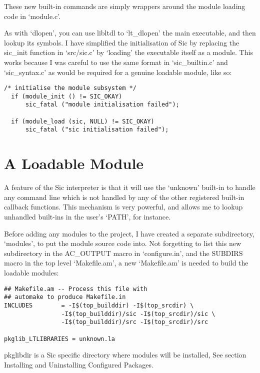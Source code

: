These new built-in commands are simply wrappers around the module loading code in `module.c'.

As with `dlopen', you can use libltdl to `lt\_{}dlopen' the main executable, and then lookup its symbols. I have simplified the initialisation of Sic by replacing the sic\_{}init function in `src/sic.c' by `loading' the executable itself as a module. This works because I was careful to use the same format in `sic\_{}builtin.c' and `sic\_{}syntax.c' as would be required for a genuine loadable module, like so: 
 	
\begin{Verbatim}[frame=single]
  /* initialise the module subsystem */
  if (module_init () != SIC_OKAY)
      sic_fatal ("module initialisation failed");

  if (module_load (sic, NULL) != SIC_OKAY)
      sic_fatal ("sic initialisation failed");
\end{Verbatim}

\section{A Loadable Module}

A feature of the Sic interpreter is that it will use the `unknown' built-in to handle any command line which is not handled by any of the other registered built-in callback functions. This mechanism is very powerful, and allows me to lookup unhandled built-ins in the user's `PATH', for instance.

Before adding any modules to the project, I have created a separate subdirectory, `modules', to put the module source code into. Not forgetting to list this new subdirectory in the AC\_{}OUTPUT macro in `configure.in', and the SUBDIRS macro in the top level `Makefile.am', a new `Makefile.am' is needed to build the loadable modules: 
 	
\begin{Verbatim}[frame=single]
## Makefile.am -- Process this file with 
## automake to produce Makefile.in
INCLUDES        = -I$(top_builddir) -I$(top_srcdir) \
                -I$(top_builddir)/sic -I$(top_srcdir)/sic \
                -I$(top_builddir)/src -I$(top_srcdir)/src

pkglib_LTLIBRARIES = unknown.la
\end{Verbatim}

pkglibdir is a Sic specific directory where modules will be installed, See section Installing and Uninstalling Configured Packages.

